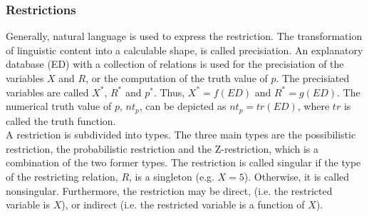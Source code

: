 \documentclass[conference]{IEEEtran}
\begin{document}
\subsubsection{Restrictions}
\label{subsubsec:restrictions}
Generally, natural language is used to express the restriction. The transformation of linguistic content into a calculable shape, is called precisiation. An explanatory database (ED) with a collection of relations is used for the precisiation of the variables \begin{math} X \end{math} and \begin{math} R \end{math}, or the computation of the truth value of \begin{math} p \end{math}. The precisiated variables are called \begin{math} X^{*} \end{math}, \begin{math} R^{*} \end{math} and \begin{math}p^{*} \end{math}. Thus, \begin{math} X^{*}=f(ED) \end{math} and \begin{math} R^{*}=g(ED) \end{math}. The numerical truth value of \begin{math} p \end{math}, \begin{math}nt_{p} \end{math}, can be depicted as \begin{math} nt_{p}=tr(ED) \end{math}, where \begin{math} tr \end{math} is called the truth function.\\
A restriction is subdivided into types. The three main types are the possibilistic restriction, the probabilistic restriction and the Z-restriction, which is a combination of the two former types. The restriction is called singular if the type of the restricting relation, \begin{math} R \end{math}, is a singleton (e.g. \begin{math} X=5 \end{math}). Otherwise, it is called nonsingular. Furthermore, the restriction may be direct, (i.e. the restricted variable is \begin{math} X \end{math}), or indirect (i.e. the restricted variable is a function of \begin{math} X \end{math}).\\
\end{document}
